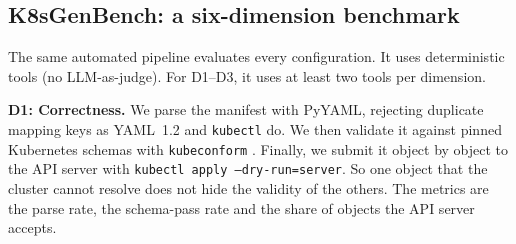 \begin{table}[t]
\centering\small
\caption{Models and access routes. Temperature and output limit could be set only for the API-generated models. For GPT, one author (T.~Hussain) sent the prompts and copied the replies under a written protocol (Section~\ref{sec:threats}).}\label{tab:models}
\end{table}

\subsection{K8sGenBench: a six-dimension benchmark}\label{sec:method-benchmark}

The same automated pipeline evaluates every configuration. It uses deterministic tools (no LLM-as-judge). For D1--D3, it uses at least two tools per dimension.

\textbf{D1: Correctness.} We parse the manifest with PyYAML, rejecting duplicate mapping keys as YAML~1.2 and \texttt{kubectl} do. We then validate it against pinned Kubernetes schemas with \texttt{kubeconform} \citep{tool_kubeconform}. Finally, we submit it object by object to the API server with \texttt{kubectl apply --dry-run=server}. So one object that the cluster cannot resolve does not hide the validity of the others. The metrics are the parse rate, the schema-pass rate and the share of objects the API server accepts.

